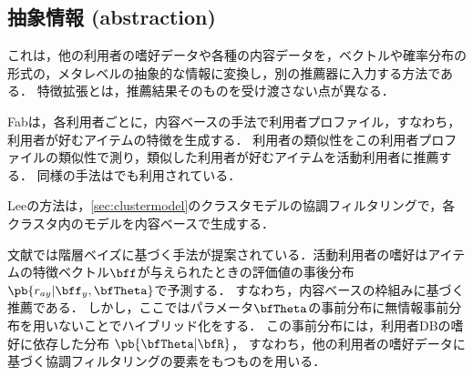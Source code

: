 
\subsection{抽象情報 (abstraction)}

これは，他の利用者の嗜好データや各種の内容データを，ベクトルや確率分布の形式の，メタレベルの抽象的な情報に変換し，別の推薦器に入力する方法である．
特徴拡張とは，推薦結果そのものを受け渡さない点が異なる．

Fab\cite{macm:97:02}は，各利用者ごとに，内容ベースの手法で利用者プロファイル，すなわち，利用者が好むアイテムの特徴を生成する．
利用者の類似性をこの利用者プロファイルの類似性で測り，類似した利用者が好むアイテムを活動利用者に推薦する．
同様の手法は\cite{ej:050}でも利用されている．

Leeの方法\cite{icml:01:01}は，\ref{sec:clustermodel}のクラスタモデルの協調フィルタリングで，各クラスタ内のモデルを内容ベースで生成する．

文献\cite{uai:03:03}では階層ベイズに基づく手法が提案されている．活動利用者の嗜好はアイテムの特徴ベクトル$\bff$が与えられたときの評価値の事後分布$\pb{r_{ay}|\bff_y,\bfTheta}$で予測する．
すなわち，内容ベースの枠組みに基づく推薦である．
しかし，ここではパラメータ$\bfTheta$の事前分布に無情報事前分布を用いないことでハイブリッド化をする．
この事前分布には，利用者DBの嗜好に依存した分布 $\pb{\bfTheta|\bfR}$，
すなわち，他の利用者の嗜好データに基づく協調フィルタリングの要素をもつものを用いる．

